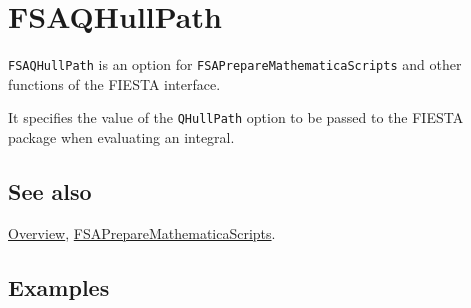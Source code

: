 \documentclass[../FeynHelpersManual.tex]{subfiles}
\begin{document}
\hypertarget{fsaqhullpath}{
\section{FSAQHullPath}\label{fsaqhullpath}}

\texttt{FSAQHullPath} is an option for
\texttt{FSAPrepareMathematicaScripts} and other functions of the FIESTA
interface.

It specifies the value of the \texttt{QHullPath} option to be passed to
the FIESTA package when evaluating an integral.

\subsection{See also}

\hyperlink{toc}{Overview},
\hyperlink{fsapreparemathematicascripts}{FSAPrepareMathematicaScripts}.

\subsection{Examples}
\end{document}

